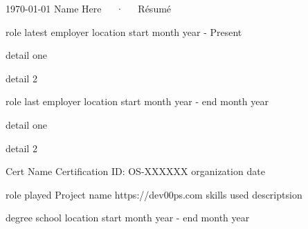 \documentclass[11pt, letterpaper]{awesome-cv}
\begin{document}
\makecvheader[C]

\makecvfooter
  {\today}
  {Name Here~~~·~~~Résumé}
  {\thepage}

\begin{cvparagraph}



\end{cvparagraph}

\begin{cventries}


  \cventry
    {role}
    {latest employer}
    {location}
    {start month year - Present}
    {
      \begin{cvitems}
        \item{detail one}
        \item{detail 2}
      \end{cvitems}
    }


  \cventry
    {role}
    {last employer}
    {location}
    {start month year - end month year}
    {
      \begin{cvitems}
        \item{detail one}
        \item{detail 2}
      \end{cvitems}
    }



\end{cventries}

\begin{cvhonors}

  \cvhonor
    {Cert Name}
    {Certification ID: OS-XXXXXX}
    {organization}
    {date}


\end{cvhonors}

\begin{cventries}

  \cventry
    {role played}
    {Project name}
    {https://dev00ps.com}
    {skills used}
    {descriptsion}


\end{cventries}

\begin{cventries}

  \cventry
    {degree}
    {school}
    {location}
    {start month year - end month year}
    {
    }


\end{cventries}

\end{document}
